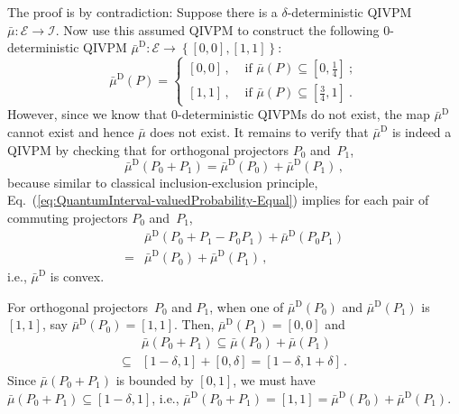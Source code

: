 \documentclass[english,reprint, aps, prl,superscriptaddress, showpacs,
showkeys, longbibliography, amsmath, amssymb, floatfix]{revtex4-1}
\theoremstyle{plain}
\theoremstyle{definition}
\newcommand{\events}{\ensuremath{\mathcal{E}}}
\newcommand{\imposs}{\ensuremath{\left[0,0\right]}}
\newcommand{\necess}{\ensuremath{\left[1,1\right]}}
\begin{document}
The proof is by contradiction: Suppose there is a $\delta$-deterministic
QIVPM~$\bar{\mu}:\events\rightarrow\mathscr{I}$. Now use this assumed
QIVPM to construct the following $0$-deterministic QIVPM $\bar{\mu}^{\textrm{D}}:\events\rightarrow\left\{ \imposs,\necess\right\} $:
\begin{equation}
\bar{\mu}^{\textrm{D}}\left(P\right)=\begin{cases}
\imposs\,, & \textrm{ if }\bar{\mu}\left(P\right)\subseteq\left[0,\tfrac{1}{4}\right]\:;\\
\necess\,, & \textrm{ if }\bar{\mu}\left(P\right)\subseteq\left[\tfrac{3}{4},1\right]\:.
\end{cases}
\end{equation}
However, since we know that $0$-deterministic QIVPMs do not exist,
the map $\bar{\mu}^{\textrm{D}}$ cannot exist and hence $\bar{\mu}$
does not exist. It remains to verify that $\bar{\mu}^{\textrm{D}}$
is indeed a QIVPM by checking that for orthogonal projectors $P_{0}$
and~$P_{1}$, 
\begin{equation}
\bar{\mu}^{\textrm{D}}\left(P_{0}+P_{1}\right)=\bar{\mu}^{\textrm{D}}\left(P_{0}\right)+\bar{\mu}^{\textrm{D}}\left(P_{1}\right)\,,\label{eq:QuantumInterval-valuedProbability-Equal}
\end{equation}
because similar to classical inclusion-exclusion principle, Eq.~(\ref{eq:QuantumInterval-valuedProbability-Equal})
implies for each pair of commuting projectors $P_{0}$ and~$P_{1}$,
\begin{equation}
\begin{aligned} & \bar{\mu}^{\textrm{D}}\left(P_{0}+P_{1}-P_{0}P_{1}\right)+\bar{\mu}^{\textrm{D}}\left(P_{0}P_{1}\right)\\
={} & \bar{\mu}^{\textrm{D}}\left(P_{0}\right)+\bar{\mu}^{\textrm{D}}\left(P_{1}\right)\,,
\end{aligned}
\end{equation}
i.e., $\bar{\mu}^{\textrm{D}}$ is convex.

For orthogonal projectors~$P_{0}$ and $P_{1}$, when one of $\bar{\mu}^{\textrm{D}}\left(P_{0}\right)$
and $\bar{\mu}^{\textrm{D}}\left(P_{1}\right)$ is $\necess$, say
$\bar{\mu}^{\textrm{D}}\left(P_{0}\right)=\necess$. Then, $\bar{\mu}^{\textrm{D}}\left(P_{1}\right)=\imposs$
and 
\begin{equation}
\begin{aligned} & \bar{\mu}\left(P_{0}+P_{1}\right)\subseteq\bar{\mu}\left(P_{0}\right)+\bar{\mu}\left(P_{1}\right)\\
\subseteq{} & \left[1-\delta,1\right]+\left[0,\delta\right]=\left[1-\delta,1+\delta\right]\,.
\end{aligned}
\end{equation}
Since $\bar{\mu}\left(P_{0}+P_{1}\right)$ is bounded by $\left[0,1\right]$,
we must have $\bar{\mu}\left(P_{0}+P_{1}\right)\subseteq\left[1-\delta,1\right]$,
i.e., $\bar{\mu}^{\textrm{D}}\left(P_{0}+P_{1}\right)=\necess=\bar{\mu}^{\textrm{D}}\left(P_{0}\right)+\bar{\mu}^{\textrm{D}}\left(P_{1}\right)$.
\end{document}
